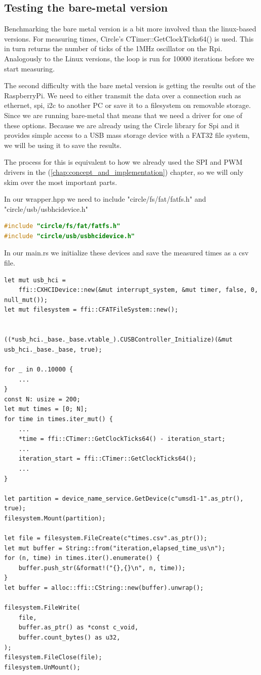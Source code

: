 \subsection{Testing the bare-metal version}
Benchmarking the bare metal version is a bit more involved than the linux-based versions.
For measuring times, Circle's CTimer::GetClockTicks64() is used. This in turn returns the number of ticks of the 1MHz oscillator on the Rpi.
Analogously to the Linux versions, the loop is run for 10000 iterations before we start measuring.

The second difficulty with the bare metal version is getting the results out of the RaspberryPi.
We need to either transmit the data over a connection such as ethernet, spi, i2c to another PC or save it to a filesystem on removable storage.
Since we are running bare-metal that means that we need a driver for one of these options.
Because we are already using the Circle library for Spi and it provides simple access to a USB mass storage device with a FAT32 file system, we will be using it to save the results.

The process for this is equivalent to how we already used the SPI and PWM drivers in the  (\ref{chap:concept_and_implementation}) chapter,
so we will only skim over the most important parts.

In our wrapper.hpp we need to include "circle/fs/fat/fatfs.h" and "circle/usb/usbhcidevice.h"
\begin{lstlisting}[language=C++]
#include "circle/fs/fat/fatfs.h"
#include "circle/usb/usbhcidevice.h"
\end{lstlisting}

In our main.rs we initialize these devices and save the measured times as a csv file.
\begin{lstlisting}
let mut usb_hci =
    ffi::CXHCIDevice::new(&mut interrupt_system, &mut timer, false, 0, null_mut());
let mut filesystem = ffi::CFATFileSystem::new();


((*usb_hci._base._base.vtable_).CUSBController_Initialize)(&mut usb_hci._base._base, true);

for _ in 0..10000 {
    ...
}
const N: usize = 200;
let mut times = [0; N];
for time in times.iter_mut() {
    ...
    *time = ffi::CTimer::GetClockTicks64() - iteration_start;
    ...
    iteration_start = ffi::CTimer::GetClockTicks64();
    ...
}

let partition = device_name_service.GetDevice(c"umsd1-1".as_ptr(), true);
filesystem.Mount(partition);

let file = filesystem.FileCreate(c"times.csv".as_ptr());
let mut buffer = String::from("iteration,elapsed_time_us\n");
for (n, time) in times.iter().enumerate() {
    buffer.push_str(&format!("{},{}\n", n, time));
}
let buffer = alloc::ffi::CString::new(buffer).unwrap();

filesystem.FileWrite(
    file,
    buffer.as_ptr() as *const c_void,
    buffer.count_bytes() as u32,
);
filesystem.FileClose(file);
filesystem.UnMount();
\end{lstlisting}

